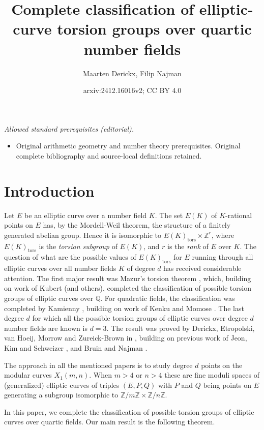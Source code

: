 \documentclass[11pt,reqno]{amsart}
\title{Complete classification of elliptic-curve torsion groups over quartic number fields}
\author{Maarten Derickx, Filip Najman}
\date{arxiv:2412.16016v2; CC BY 4.0}
\theoremstyle{definition}
\numberwithin{equation}{section}
\newcommand{\Q}{\mathbb{Q}}
\newcommand{\Z}{\mathbb{Z}}
\newcommand{\tor}{\mathrm{tors}}
\def\tg#1#2{\mathbb Z/#1\mathbb Z \times \mathbb Z /#2 \mathbb Z}
\begin{document}
\maketitle
\noindent\textit{Allowed standard prerequisites (editorial).}\begin{itemize}
\item Original arithmetic geometry and number theory prerequisites. Original complete bibliography and source-local definitions retained.
\end{itemize}\medskip
\section{Introduction}
Let $E$ be an elliptic curve over a number field $K$. The set $E(K)$ of $K$-rational points on $E$ has, by the Mordell-Weil theorem, the structure of a finitely generated abelian group. Hence it is isomorphic to $E(K)_\tor \times \Z^r$, where $E(K)_\tor$ is the \textit{torsion subgroup} of $E(K)$, and $r$ is the \textit{rank} of $E$ over $K$. The question of what are the possible values of $E(K)_\tor$ for $E$ running through all elliptic curves over all number fields $K$ of degree $d$ has received considerable attention. The first major result was Mazur's torsion theorem \cite{mazur77}, which, building on work of Kubert \cite{Kubert76} (and others), completed the classification of possible torsion groups of elliptic curves over $\Q.$ For quadratic fields, the classification was completed by Kamienny \cite{kamienny92}, building on work of Kenku and Momose \cite{KM88}. The last degree $d$ for which all the possible torsion groups of elliptic curves over degree $d$ number fields are known is $d=3$. The result was proved by Derickx, Etropolski, van Hoeij, Morrow and Zureick-Brown in \cite{Deg3Class}, building on previous work of Jeon, Kim and Schweizer \cite{JeonKimSchweizer04}, and Bruin and Najman \cite{BruinNajman15}.

The approach in all the mentioned papers is to study degree $d$ points on the modular curves $X_1(m,n)$. When $m > 4$ or $n > 4$ these are fine moduli spaces of (generalized) elliptic curves of triples $(E,P,Q)$ with $P$ and $Q$ being points on $E$ generating a subgroup isomorphic to $\tg{m}{n}$.

In this paper, we complete the classification of possible torsion groups of elliptic curves over quartic fields. Our main result is the following theorem.
\end{document}
